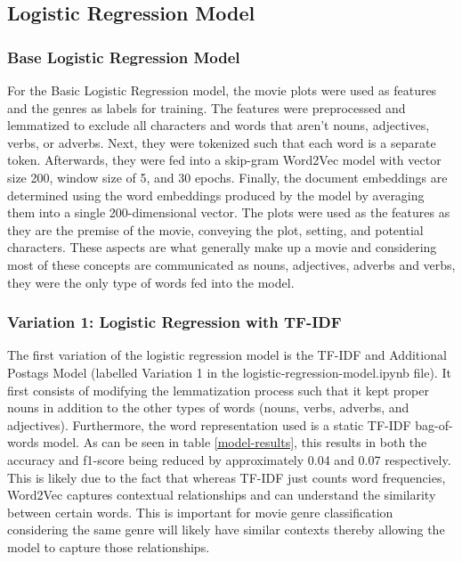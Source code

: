 \subsection{Logistic Regression Model}
\subsubsection{Base Logistic Regression Model}
For the Basic Logistic Regression model, the movie plots were used as features and the genres as labels for training. 
The features were preprocessed and lemmatized to exclude all characters and words that aren’t nouns, adjectives, verbs, or adverbs. 
Next, they were tokenized such that each word is a separate token. 
Afterwards, they were fed into a skip-gram Word2Vec model with vector size 200, window size of 5, and 30 epochs. 
Finally, the document embeddings are determined using the word embeddings produced by the model by averaging them into a single 200-dimensional vector. 
The plots were used as the features as they are the premise of the movie, conveying the plot, setting, and potential characters. 
These aspects are what generally make up a movie and considering most of these concepts are communicated as nouns, adjectives, adverbs and verbs, they were the only type of words fed into the model.

\subsubsection{Variation 1: Logistic Regression with TF-IDF}
The first variation of the logistic regression model is the TF-IDF and Additional Postags Model (labelled Variation 1 in the logistic-regression-model.ipynb file). 
It first consists of modifying the lemmatization process such that it kept proper nouns in addition to the other types of words (nouns, verbs, adverbs, and adjectives). 
Furthermore, the word representation used is a static TF-IDF bag-of-words model. 
As can be seen in table \ref{model-results}, this results in both the accuracy and f1-score being reduced by approximately 0.04 and 0.07 respectively. 
This is likely due to the fact that whereas TF-IDF just counts word frequencies, Word2Vec captures contextual relationships and can understand the similarity between certain words. 
This is important for movie genre classification considering the same genre will likely have similar contexts thereby allowing the model to capture those relationships.


